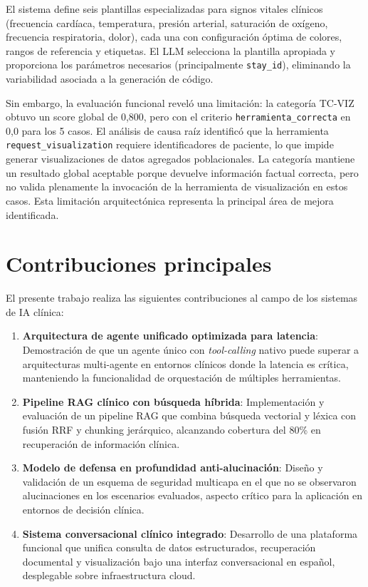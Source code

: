 El sistema define seis plantillas especializadas para signos vitales clínicos (frecuencia cardíaca, temperatura, presión arterial, saturación de oxígeno, frecuencia respiratoria, dolor), cada una con configuración óptima de colores, rangos de referencia y etiquetas. El \ac{LLM} selecciona la plantilla apropiada y proporciona los parámetros necesarios (principalmente \texttt{stay\_id}), eliminando la variabilidad asociada a la generación de código.

Sin embargo, la evaluación funcional reveló una limitación: la categoría TC-VIZ obtuvo un score global de 0,800, pero con el criterio \texttt{herramienta\_correcta} en 0,0 para los 5 casos. El análisis de causa raíz identificó que la herramienta \texttt{request\_visualization} requiere identificadores de paciente, lo que impide generar visualizaciones de datos agregados poblacionales. La categoría mantiene un resultado global aceptable porque devuelve información factual correcta, pero no valida plenamente la invocación de la herramienta de visualización en estos casos. Esta limitación arquitectónica representa la principal área de mejora identificada.

\section{Contribuciones principales}
\label{sec:contribuciones}

El presente trabajo realiza las siguientes contribuciones al campo de los sistemas de \ac{IA} clínica:

\begin{enumerate}
    \item \textbf{Arquitectura de agente unificado optimizada para latencia}: Demostración de que un agente único con \textit{tool-calling} nativo puede superar a arquitecturas multi-agente en entornos clínicos donde la latencia es crítica, manteniendo la funcionalidad de orquestación de múltiples herramientas.
    
    \item \textbf{Pipeline \ac{RAG} clínico con búsqueda híbrida}: Implementación y evaluación de un pipeline \ac{RAG} que combina búsqueda vectorial y léxica con fusión \ac{RRF} y chunking jerárquico, alcanzando cobertura del 80\% en recuperación de información clínica.
    
    \item \textbf{Modelo de defensa en profundidad anti-alucinación}: Diseño y validación de un esquema de seguridad multicapa en el que no se observaron alucinaciones en los escenarios evaluados, aspecto crítico para la aplicación en entornos de decisión clínica.
    
    \item \textbf{Sistema conversacional clínico integrado}: Desarrollo de una plataforma funcional que unifica consulta de datos estructurados, recuperación documental y visualización bajo una interfaz conversacional en español, desplegable sobre infraestructura cloud.
\end{enumerate}

